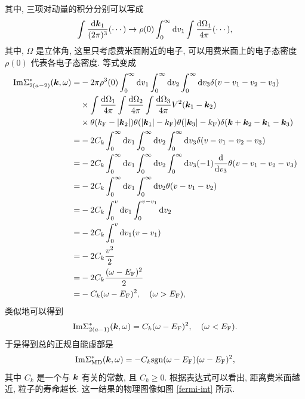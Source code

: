 其中, 三项对动量的积分分别可以写成 
\begin{equation}
    \int\frac{\mathrm{d}\boldsymbol{k}_1}{(2\pi)^3}(\cdots)\to \rho(0)\int_0^\infty \mathrm{d} v_1\int\frac{\mathrm{d}\Omega_1}{4\pi}(\cdots),
\end{equation}
其中,  $\Omega$ 是立体角, 这里只考虑费米面附近的电子, 可以用费米面上的电子态密度 $\rho(0)$ 代表各电子态密度. 等式变成 
 \begin{align}
        \mathrm{Im}\Sigma_{2(a-2)}^*(\boldsymbol{k},\omega)=&-2\pi\rho^3(0)\int_0^\infty\mathrm{d} v_1\int_0^\infty \mathrm{d} v_2 \int_0^\infty \mathrm{d} v_3\delta(v-v_1-v_2-v_3)\nonumber\\
        &\times \int\frac{\mathrm{d}\Omega_1}{4\pi}\int\frac{\mathrm{d}\Omega_2}{4\pi}\int\frac{\mathrm{d}\Omega_3}{4\pi}V^2(\boldsymbol{k}_1-\boldsymbol{k}_2)\nonumber\\
        &\times\theta(k_{\mathrm{F}}-|\boldsymbol{k}_2|)\theta(|\boldsymbol{k}_1|-k_{\mathrm{F}})\theta(|\boldsymbol{k}_3|-k_{\mathrm{F}})\delta(\boldsymbol{k}+\boldsymbol{k}_2-\boldsymbol{k}_1-\boldsymbol{k}_3)\nonumber\\
        =& -2C_k\int_0^\infty\mathrm{d} v_1\int_0^\infty \mathrm{d} v_2 \int_0^\infty \mathrm{d} v_3 \delta(v-v_1-v_2-v_3)\nonumber\\
        =&-2 C_k \int_0^\infty\mathrm{d} v_1 \int_0^\infty \mathrm{d} v_2 \int_0^\infty \mathrm{d} v_3 (-1)\frac{\mathrm{d}}{\mathrm{d} v_3}\theta(v-v_1-v_2-v_3)\nonumber\\
        =&-2 C_k\int_0^\infty \mathrm{d} v_1 \int_0^\infty \mathrm{d} v_2 \theta(v-v_1-v_2)\nonumber\\
        =&-2C_k\int_0^v\mathrm{d} v_1\int_0^{v-v_1}\mathrm{d} v_2\nonumber\\
        =&-2 C_k\int_0^v\mathrm{d} v_1(v-v_1)\nonumber\\
        =&-2 C_k\frac{v^2}{2}\nonumber\\
        =&-2 C_k\frac{(\omega-E_{\mathrm{F}})^2}{2}\nonumber\\
        =&-C_k(\omega-E_{\mathrm{F}})^2,\quad (\omega>E_{\mathrm{F}}),
    \end{align}
类似地可以得到 
\begin{equation}
    \mathrm{Im}\Sigma_{2(a-1)}^*(\boldsymbol{k},\omega)=C_k(\omega-E_{\mathrm{F}})^2,\quad (\omega<E_{\mathrm{F}}).
\end{equation}
于是得到总的正规自能虚部是
\begin{equation}
    \mathrm{Im}\Sigma_{\mathrm{MD}}^*(\boldsymbol{k},\omega)=-C_k\mathrm{sgn}(\omega-E_{\mathrm{F}})(\omega-E_{\mathrm{F}})^2,
\end{equation}
其中 $C_k$ 是一个与 $\boldsymbol{k}$ 有关的常数, 且 $C_k\ge0$. 根据表达式可以看出, 距离费米面越近, 粒子的寿命越长. 这一结果的物理图像如图 \ref{fermi-int} 所示. 
